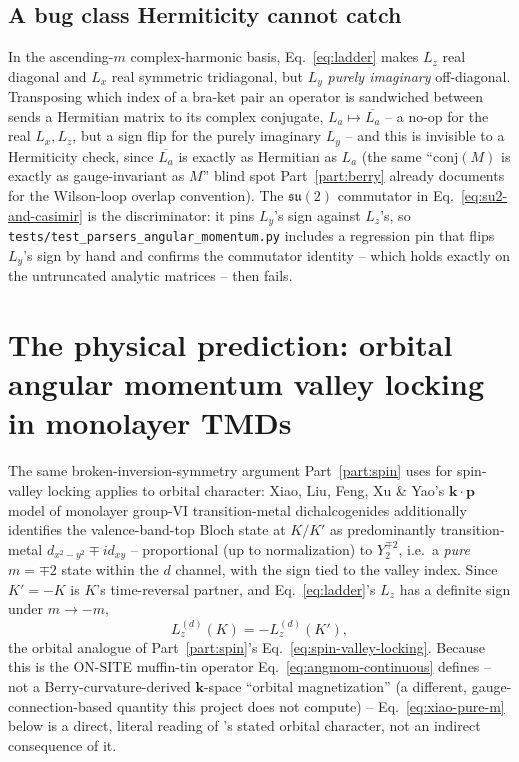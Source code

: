 \documentclass[11pt]{article}
\begin{document}
\subsection{A bug class Hermiticity cannot catch}

In the ascending-$m$ complex-harmonic basis, Eq.~\eqref{eq:ladder} makes $L_z$ real
diagonal and $L_x$ real symmetric tridiagonal, but $L_y$ \emph{purely imaginary}
off-diagonal. Transposing which index of a bra-ket pair an operator is sandwiched between
sends a Hermitian matrix to its complex conjugate, $L_a\mapsto\overline{L_a}$ -- a no-op
for the real $L_x,L_z$, but a sign flip for the purely imaginary $L_y$ -- and this is
invisible to a Hermiticity check, since $\overline{L_a}$ is exactly as Hermitian as $L_a$
(the same ``$\mathrm{conj}(M)$ is exactly as gauge-invariant as $M$'' blind spot
Part~\ref{part:berry} already documents for the Wilson-loop overlap convention). The
$\mathfrak{su}(2)$ commutator in Eq.~\eqref{eq:su2-and-casimir} is the discriminator: it
pins $L_y$'s sign against $L_z$'s, so \texttt{tests/test\_parsers\_angular\_momentum.py}
includes a regression pin that flips $L_y$'s sign by hand and confirms the commutator
identity -- which holds exactly on the untruncated analytic matrices -- then fails.

\section{The physical prediction: orbital angular momentum valley locking in monolayer TMDs}

The same broken-inversion-symmetry argument Part~\ref{part:spin} uses for spin-valley
locking applies to orbital character: Xiao, Liu, Feng, Xu \& Yao's $\mathbf k\cdot\mathbf p$
model of monolayer group-VI transition-metal dichalcogenides \cite{xiao2012} additionally
identifies the valence-band-top Bloch state at $K/K'$ as predominantly transition-metal
$d_{x^2-y^2}\mp id_{xy}$ -- proportional (up to normalization) to $Y_2^{\mp2}$, i.e.\ a
\emph{pure} $m=\mp2$ state within the $d$ channel, with the sign tied to the valley index.
Since $K'=-K$ is $K$'s time-reversal partner, and Eq.~\eqref{eq:ladder}'s $L_z$ has a
definite sign under $m\to-m$,
\begin{equation}
  L_z^{(d)}(K) = -L_z^{(d)}(K'),
  \label{eq:angmom-valley-locking}
\end{equation}
the orbital analogue of Part~\ref{part:spin}'s Eq.~\eqref{eq:spin-valley-locking}. Because
this is the ON-SITE muffin-tin operator Eq.~\eqref{eq:angmom-continuous} defines --
not a Berry-curvature-derived $\mathbf k$-space ``orbital magnetization'' (a different,
gauge-connection-based quantity this project does not compute) -- Eq.~\eqref{eq:xiao-pure-m}
below is a direct, literal reading of \cite{xiao2012}'s stated orbital character, not an
indirect consequence of it.
\end{document}
